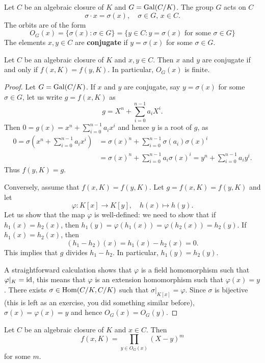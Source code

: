 Let $C$ be an algebraic closure of $K$ and 
$G=\operatorname{Gal}(C/K)$. The group $G$ acts on $C$
\[
\sigma\cdot x=\sigma(x),\quad
\sigma\in G,\,x\in C.
\]
The orbits 
are of the form 
\[
O_G(x)=\{\sigma(x):\sigma\in G\}
=\{y\in C:y=\sigma(x)\text{ for some $\sigma\in G$}\}
\]
The elements $x,y\in C$ are \textbf{conjugate} 
if $y=\sigma(x)$ for some $\sigma\in G$. 

\begin{proposition}
    Let $C$ be an algebraic closure of $K$ and $x,y\in C$. Then 
    $x$ and $y$ are conjugate if and only if $f(x,K)=f(y,K)$. In particular, 
    $O_G(x)$ is finite. 
\end{proposition}

\begin{proof}
    Let $G=\operatorname{Gal}(C/K)$. 
    If $x$ and $y$ are conjugate, say $y=\sigma(x)$ for some $\sigma\in G$, 
    let us write $g=f(x,K)$ as 
    \[
    g=X^n+\sum_{i=0}^{n-1} a_iX^i. 
    \]
    Then $0=g(x)=x^n+\sum_{i=0}^{n-1}a_ix^i$ and hence $y$ is
    a root of $g$, as 
    \begin{align*}
    0=\sigma\left(x^n+\sum_{i=0}^{n-1}a_ix^i\right)
    &=\sigma(x)^n+\sum_{i=0}^{n-1}\sigma(a_i)\sigma(x)^i\\
    &=\sigma(x)^n+\sum_{i=0}^{n-1}a_i\sigma(x)^i
    =y^n+\sum_{i=0}^{n-1}a_iy^i.
    \end{align*}
    Thus $f(y,K)=g$. 
    
    Conversely, assume that $f(x,K)=f(y,K)$. Let
    $g=f(x,K)=f(y,K)$ and let 
    \[
    \varphi\colon K[x]\to K[y],
    \quad
    h(x)\mapsto h(y).
    \]
    Let us show that the map $\varphi$ is well-defined: we need to show 
    that if 
    $h_1(x)=h_2(x)$, then $h_1(y)=\varphi(h_1(x))=\varphi(h_2(x))=h_2(y)$. 
    If $h_1(x)=h_2(x)$, then 
    \[
    (h_1-h_2)(x)=h_1(x)-h_2(x)=0.
    \]
    This implies
    that $g$ divides $h_1-h_2$. In particular, $h_1(y)=h_2(y)$.
    
    A straightforward calculation shows that $\varphi$ is a field 
    homomorphism such that $\varphi|_K=\operatorname{id}$, this means that
    $\varphi$ is 
    an extension homomorphism such that $\varphi(x)=y$. There exists
    $\sigma\in\operatorname{Hom}(C/K,C/K)$ such that 
    $\sigma|_{K[x]}=\varphi$. Since $\sigma$ is bijective 
    (this is left as an exercise, you did something similar before), 
    $\sigma(x)=\varphi(x)=y$ and hence 
    $O_G(x)=O_G(y)$. 
\end{proof}

\begin{proposition}
    Let $C$ be an algebraic closure of $K$ and $x\in C$. Then 
    \[
    f(x,K)=\prod_{y\in O_G(x)}(X-y)^m
    \]
    for some $m$. 
\end{proposition}

